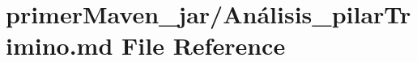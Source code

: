 \hypertarget{_an_xC3_xA1lisis__pilar_trimino_8md}{}\section{primer\+Maven\+\_\+jar/\+Análisis\+\_\+pilar\+Trimino.md File Reference}
\label{_an_xC3_xA1lisis__pilar_trimino_8md}
